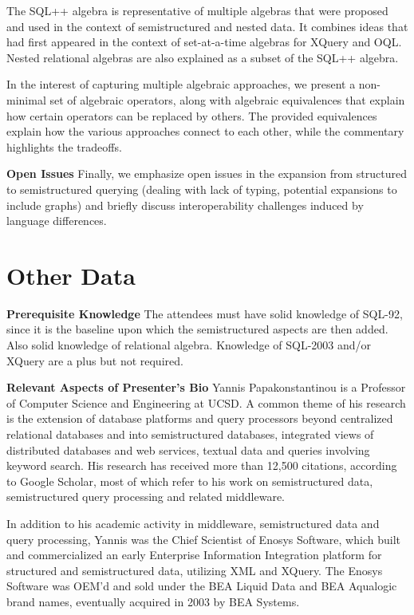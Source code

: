 The SQL++ algebra is representative of multiple algebras that were proposed and used in the context of semistructured and nested data. It combines ideas that had first appeared in the context of set-at-a-time algebras for XQuery and OQL. Nested relational algebras are also explained as a subset of the SQL++ algebra.%

In the interest of capturing multiple algebraic approaches, we present a non-minimal set of algebraic operators, along with algebraic equivalences that explain how certain operators can be replaced by others. The provided equivalences explain how the various approaches connect to each other, while the commentary highlights the tradeoffs.

\noindent \textbf{Open Issues} Finally, we emphasize open issues in the expansion from structured to semistructured querying (dealing with lack of typing, potential expansions to include graphs) and briefly discuss interoperability challenges induced by language differences.

\section{Other Data}
\label{sec:duration}

\noindent \textbf{Prerequisite Knowledge} 
\label{sec:audience}
The attendees must have solid knowledge of SQL-92, since it is the baseline upon which the semistructured aspects are then added. Also solid knowledge of relational algebra. Knowledge of SQL-2003 and/or XQuery are a plus but not required.

\noindent \textbf{Relevant Aspects of Presenter's Bio} 
Yannis Papakonstantinou is a Professor of Computer Science and Engineering at UCSD. A common theme of his research is the extension of database platforms and query processors beyond centralized relational databases and into semistructured databases, integrated views of distributed databases and web services, textual data and queries involving keyword search. His research has received more than 12,500 citations, according to Google Scholar, most of which refer to his work on semistructured data, semistructured query processing and related middleware.

In addition to his academic activity in middleware, semistructured data and query processing, Yannis was the Chief Scientist of Enosys Software, which built and commercialized an early Enterprise Information Integration platform for structured and semistructured data, utilizing XML and XQuery. The Enosys Software was OEM'd and sold under the BEA Liquid Data and BEA Aqualogic brand names, eventually acquired in 2003 by BEA Systems.

